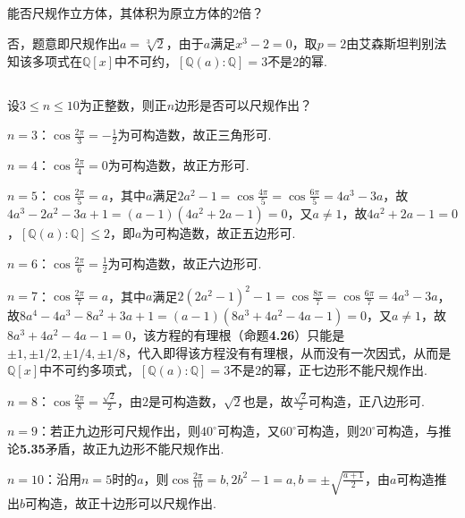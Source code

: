 \subsection{}
能否尺规作立方体，其体积为原立方体的$2$倍？

\jie 否，题意即尺规作出$a=\sqrt[3]{2}$，由于$a$满足$x^3-2=0$，取$p=2$由艾森斯坦判别法知该多项式在$\mathbb{Q}[x]$中不可约，$[\mathbb{Q}(a):\mathbb{Q}]=3$不是$2$的幂.

\subsection{}
设$3\leq n\leq 10$为正整数，则正$n$边形是否可以尺规作出？

\jie $n=3$：$\cos\frac{2\pi}{3}=-\frac{1}{2}$为可构造数，故正三角形可.

$n=4$：$\cos\frac{2\pi}{4}=0$为可构造数，故正方形可.

$n=5$：$\cos\frac{2\pi}{5}=a$，其中$a$满足$2a^2-1=\cos\frac{4\pi}{5}=\cos\frac{6\pi}{5}=4a^3-3a$，故$4a^3-2a^2-3a+1=(a-1)(4a^2+2a-1)=0$，又$a\neq 1$，故$4a^2+2a-1=0$，$[\mathbb{Q}(a):\mathbb{Q}]\leq 2$，即$a$为可构造数，故正五边形可.

$n=6$：$\cos\frac{2\pi}{6}=\frac{1}{2}$为可构造数，故正六边形可.

$n=7$：$\cos\frac{2\pi}{7}=a$，其中$a$满足$2(2a^2-1)^2-1=\cos\frac{8\pi}{7}=\cos\frac{6\pi}{7}=4a^3-3a$，故$8 a^4 - 4 a^3 - 8 a^2 + 3 a + 1 =(a-1)(8a^3+4a^2-4a-1)=0$，又$a\neq 1$，故$8a^3+4a^2-4a-1=0$，该方程的有理根（{\heiti 命题}\textbf{4.26}）只能是$\pm 1,\pm1/2,\pm1/4,\pm 1/8$，代入即得该方程没有有理根，从而没有一次因式，从而是$\mathbb{Q}[x]$中不可约多项式，$[\mathbb{Q}(a):\mathbb{Q}]=3$不是$2$的幂，正七边形不能尺规作出.

$n=8$：$\cos\frac{2\pi}{8}=\frac{\sqrt{2}}{2}$，由$2$是可构造数，$\sqrt{2}$也是，故$\frac{\sqrt{2}}{2}$可构造，正八边形可.

$n=9$：若正九边形可尺规作出，则$40^{\circ}$可构造，又$60^{\circ}$可构造，则$20^{\circ}$可构造，与{\heiti 推论}\textbf{5.35}矛盾，故正九边形不能尺规作出.

$n=10$：沿用$n=5$时的$a$，则$\cos\frac{2\pi}{10}=b, 2b^2-1=a, b=\pm\sqrt{\frac{a+1}{2}}$，由$a$可构造推出$b$可构造，故正十边形可以尺规作出.

